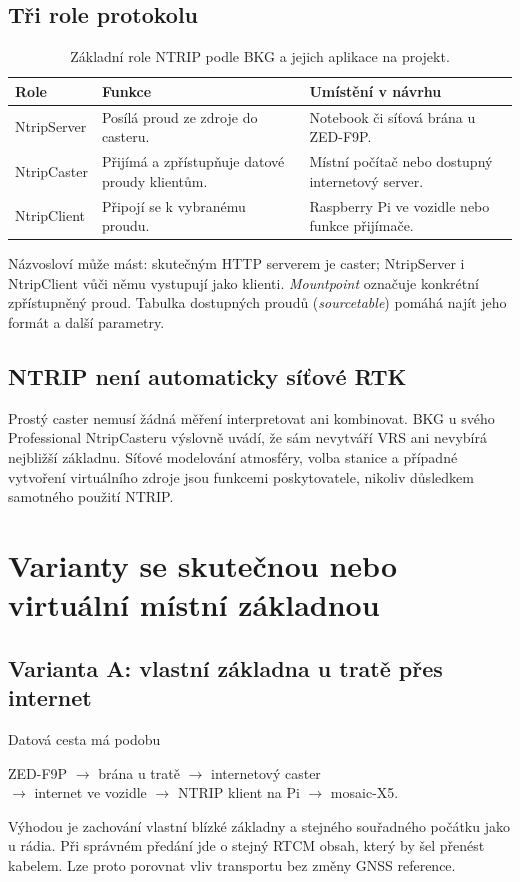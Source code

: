 \documentclass[11pt,a4paper]{article}
\begin{document}
\subsection{Tři role protokolu}
\par
\begin{table}[htbp]\centering\small
\caption{Základní role NTRIP podle BKG a jejich aplikace na projekt.\cite{bkg}}
\begin{tabularx}{\linewidth}{L{29mm}YY}\toprule
Role & Funkce & Umístění v návrhu\\\midrule
NtripServer & Posílá proud ze zdroje do casteru. & Notebook či síťová brána u ZED-F9P.\\
NtripCaster & Přijímá a zpřístupňuje datové proudy klientům. & Místní počítač nebo dostupný internetový server.\\
NtripClient & Připojí se k vybranému proudu. & Raspberry Pi ve vozidle nebo funkce přijímače.\\
\bottomrule\end{tabularx}\end{table}
\par
Názvosloví může mást: skutečným HTTP serverem je caster; NtripServer i NtripClient vůči němu vystupují jako klienti. \emph{Mountpoint} označuje konkrétní zpřístupněný proud. Tabulka dostupných proudů (\emph{sourcetable}) pomáhá najít jeho formát a další parametry.\cite{bkg}

\subsection{NTRIP není automaticky síťové RTK}
Prostý caster nemusí žádná měření interpretovat ani kombinovat. BKG u svého Professional NtripCasteru výslovně uvádí, že sám nevytváří VRS ani nevybírá nejbližší základnu.\cite{caster} Síťové modelování atmosféry, volba stanice a případné vytvoření virtuálního zdroje jsou funkcemi poskytovatele, nikoliv důsledkem samotného použití NTRIP.

\section{Varianty se skutečnou nebo virtuální místní základnou}
\subsection{Varianta A: vlastní základna u tratě přes internet}
Datová cesta má podobu
\begin{center}
\small
ZED-F9P $\longrightarrow$ brána u tratě $\longrightarrow$ internetový caster\\
$\longrightarrow$ internet ve vozidle $\longrightarrow$ NTRIP klient na Pi
$\longrightarrow$ mosaic-X5.
\end{center}
Výhodou je zachování vlastní blízké základny a stejného souřadného počátku jako u rádia. Při správném předání jde o stejný RTCM obsah, který by šel přenést kabelem. Lze proto porovnat vliv transportu bez změny GNSS reference.
\end{document}
